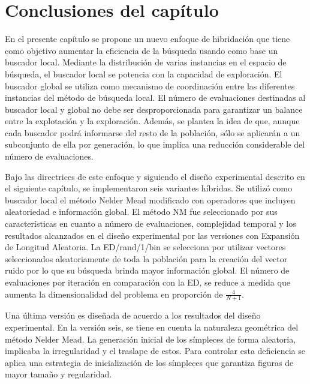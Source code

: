 \section{Conclusiones del capítulo}
En el presente capítulo se propone un nuevo enfoque de hibridación que tiene como objetivo aumentar la eficiencia de la búsqueda usando como base un buscador local. Mediante la distribución de varias instancias en el espacio de búsqueda, el buscador local se potencia  con la capacidad de exploración. El buscador global se utiliza como mecanismo de coordinación entre las diferentes instancias del método de búsqueda local. El número de evaluaciones destinadas al buscador local y global no debe ser desproporcionada para garantizar un balance entre la explotación y la exploración. Además, se plantea la idea de que, aunque cada buscador podrá informarse del resto de la población, sólo se aplicarán a un subconjunto de ella por generación, lo que implica una reducción considerable del número de evaluaciones.

Bajo las directrices de este enfoque y siguiendo el diseño experimental descrito en el siguiente capítulo, se implementaron seis variantes híbridas. Se utilizó como buscador local el método Nelder Mead modificado con operadores que incluyen aleatoriedad e información global. El método NM fue seleccionado por sus características en cuanto a número de evaluaciones, complejidad temporal y los resultados alcanzados en el diseño experimental por las versiones con Expansión de Longitud Aleatoria. La ED/rand/1/bin se selecciona por utilizar vectores seleccionados aleatoriamente de toda la población para la creación del vector ruido por lo que su búsqueda brinda mayor información global. El número de evaluaciones por iteración en comparación con la ED, se reduce a medida que aumenta la dimensionalidad del problema en proporción de $\frac{4}{N+1}$.

Una última versión es diseñada de acuerdo a los resultados del diseño experimental. En la versión seis, se tiene en cuenta la naturaleza geométrica del método Nelder Mead. La generación inicial de los símpleces de forma aleatoria, implicaba la irregularidad y el traslape de estos. Para controlar esta deficiencia se aplica una estrategia de inicialización de los símpleces que garantiza figuras de mayor tamaño y regularidad.  
